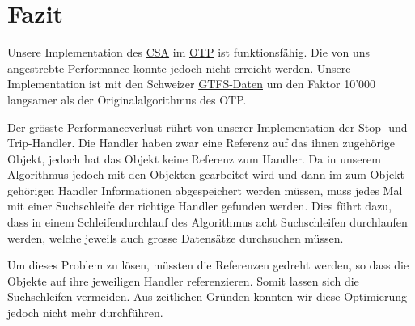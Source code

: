 \section{Fazit}
Unsere Implementation des \hyperlink{CSA}{CSA} im \hyperlink{OTP}{OTP} ist funktionsfähig. Die von uns angestrebte Performance konnte jedoch nicht erreicht werden. Unsere Implementation ist mit den Schweizer \hyperlink{GTFS}{GTFS-Daten} um den Faktor 10'000 langsamer als der Originalalgorithmus des OTP. \newline

Der grösste Performanceverlust rührt von unserer Implementation der Stop- und Trip-Handler. Die Handler haben zwar eine Referenz auf das ihnen zugehörige Objekt, jedoch hat das Objekt keine Referenz zum Handler. Da in unserem Algorithmus jedoch mit den Objekten gearbeitet wird und dann im zum Objekt gehörigen Handler Informationen abgespeichert werden müssen, muss jedes Mal mit einer Suchschleife der richtige Handler gefunden werden. Dies führt dazu, dass in einem Schleifendurchlauf des Algorithmus acht Suchschleifen durchlaufen werden, welche jeweils auch grosse Datensätze durchsuchen müssen. \newline

Um dieses Problem zu lösen, müssten die Referenzen gedreht werden, so dass die Objekte auf ihre jeweiligen Handler referenzieren. Somit lassen sich die Suchschleifen vermeiden. Aus zeitlichen Gründen konnten wir diese Optimierung jedoch nicht mehr durchführen.

